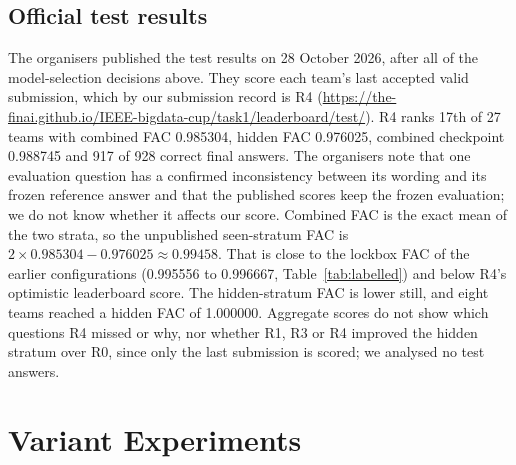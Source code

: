 \documentclass[conference]{IEEEtran}
\begin{document}
\subsection{Official test results}\label{sec:test}
The organisers published the test results on 28 October 2026, after all of the model-selection decisions above. They score each team's last accepted valid submission, which by our submission record is R4 (\url{https://the-finai.github.io/IEEE-bigdata-cup/task1/leaderboard/test/}). R4 ranks 17th of 27 teams with combined FAC 0.985304, hidden FAC 0.976025, combined checkpoint 0.988745 and 917 of 928 correct final answers. The organisers note that one evaluation question has a confirmed inconsistency between its wording and its frozen reference answer and that the published scores keep the frozen evaluation; we do not know whether it affects our score. Combined FAC is the exact mean of the two strata, so the unpublished seen-stratum FAC is $2\times0.985304-0.976025\approx0.99458$. That is close to the lockbox FAC of the earlier configurations (0.995556 to 0.996667, Table~\ref{tab:labelled}) and below R4's optimistic leaderboard score. The hidden-stratum FAC is lower still, and eight teams reached a hidden FAC of 1.000000. Aggregate scores do not show which questions R4 missed or why, nor whether R1, R3 or R4 improved the hidden stratum over R0, since only the last submission is scored; we analysed no test answers.

\section{Variant Experiments}\label{sec:negative}
\end{document}
